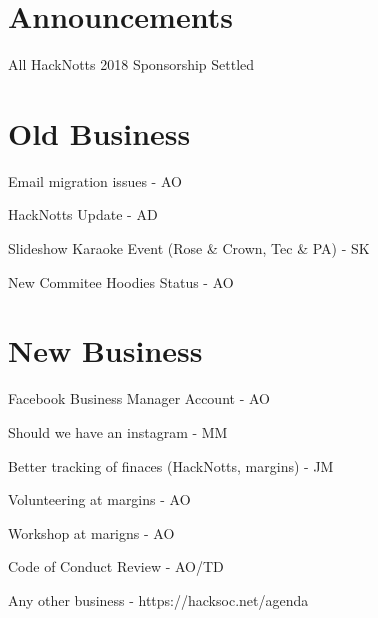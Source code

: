 \documentclass[11pt,hacksoc, agenda]{meetingmins}
\begin{document}
\maketitle

\section{Announcements}
\begin{items}
  \item All HackNotts 2018 Sponsorship Settled
\end{items}

\section{Old Business}
\begin{items}
  \item Email migration issues - AO
  \item HackNotts Update - AD
  \item Slideshow Karaoke Event (Rose \& Crown, Tec \& PA) - SK
  \item New Commitee Hoodies Status - AO
\end{items}

\section{New Business}
\begin{items}
  \item Facebook Business Manager Account - AO
  \item Should we have an instagram - MM
  \item Better tracking of finaces (HackNotts, margins) - JM
  \item Volunteering at margins - AO
  \item Workshop at marigns - AO
  \item Code of Conduct Review - AO/TD
  \item Any other business - https://hacksoc.net/agenda
\end{items}

\vspace{1em}
\nextmeeting{}
\end{document}
